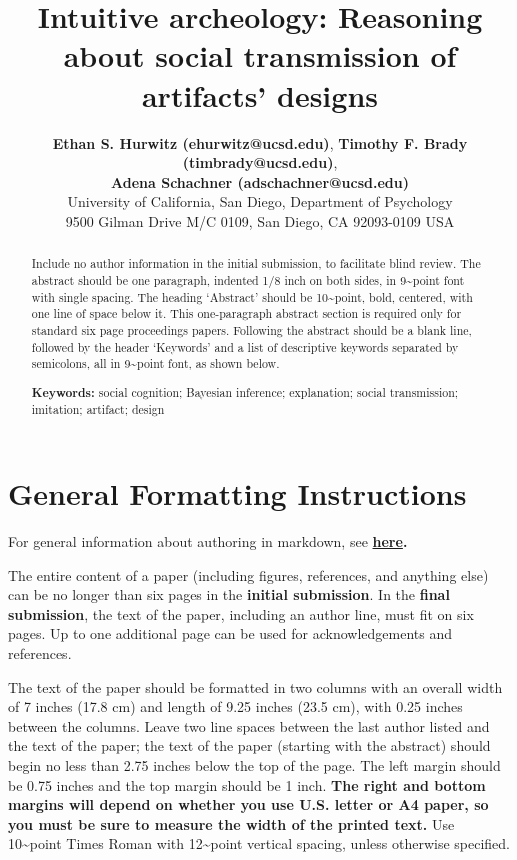 \documentclass[10pt, letterpaper]{article}
\title{Intuitive archeology: Reasoning about social transmission of artifacts'
designs}
\author{{\large \bf Ethan S. Hurwitz (ehurwitz@ucsd.edu)}, {\large \bf Timothy F. Brady (timbrady@ucsd.edu)}, \\ {\large \bf Adena Schachner (adschachner@ucsd.edu)} \\ University of California, San Diego, Department of Psychology \\ 9500 Gilman Drive M/C 0109, San Diego, CA 92093-0109 USA}
\begin{document}
\maketitle

\begin{abstract}
Include no author information in the initial submission, to facilitate
blind review. The abstract should be one paragraph, indented 1/8 inch on
both sides, in 9\textasciitilde{}point font with single spacing. The
heading `Abstract' should be 10\textasciitilde{}point, bold, centered,
with one line of space below it. This one-paragraph abstract section is
required only for standard six page proceedings papers. Following the
abstract should be a blank line, followed by the header `Keywords' and a
list of descriptive keywords separated by semicolons, all in
9\textasciitilde{}point font, as shown below.

\textbf{Keywords:}
social cognition; Bayesian inference; explanation; social transmission;
imitation; artifact; design
\end{abstract}

\section{General Formatting
Instructions}\label{general-formatting-instructions}

For general information about authoring in markdown, see
\textbf{\href{http://rmarkdown.rstudio.com/authoring_basics.html}{here}.}

The entire content of a paper (including figures, references, and
anything else) can be no longer than six pages in the
\textbf{initial submission}. In the \textbf{final submission}, the text
of the paper, including an author line, must fit on six pages. Up to one
additional page can be used for acknowledgements and references.

The text of the paper should be formatted in two columns with an overall
width of 7 inches (17.8 cm) and length of 9.25 inches (23.5 cm), with
0.25 inches between the columns. Leave two line spaces between the last
author listed and the text of the paper; the text of the paper (starting
with the abstract) should begin no less than 2.75 inches below the top
of the page. The left margin should be 0.75 inches and the top margin
should be 1 inch. \textbf{The right and bottom margins will depend on
whether you use U.S. letter or A4 paper, so you must be sure to
measure the width of the printed text.} Use 10\textasciitilde{}point
Times Roman with 12\textasciitilde{}point vertical spacing, unless
otherwise specified.
\end{document}
